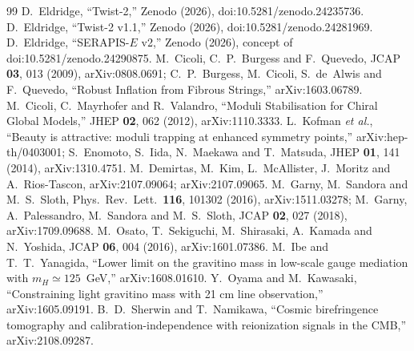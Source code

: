 \documentclass[aps,prd,twocolumn,superscriptaddress,nofootinbib,showkeys]{revtex4-2}
\begin{document}
\begin{thebibliography}{99}
 D.~Eldridge, ``Twist-2,'' Zenodo (2026), doi:10.5281/zenodo.24235736.
 D.~Eldridge, ``Twist-2 v1.1,'' Zenodo (2026), doi:10.5281/zenodo.24281969.
 D.~Eldridge, ``SERAPIS-$E$ v2,'' Zenodo (2026), concept of doi:10.5281/zenodo.24290875.
 M.~Cicoli, C.~P.~Burgess and F.~Quevedo, JCAP \textbf{03}, 013 (2009), arXiv:0808.0691; C.~P.~Burgess, M.~Cicoli, S.~de~Alwis and F.~Quevedo, ``Robust Inflation from Fibrous Strings,'' arXiv:1603.06789.
 M.~Cicoli, C.~Mayrhofer and R.~Valandro, ``Moduli Stabilisation for Chiral Global Models,'' JHEP \textbf{02}, 062 (2012), arXiv:1110.3333.
 L.~Kofman \emph{et al.}, ``Beauty is attractive: moduli trapping at enhanced symmetry points,'' arXiv:hep-th/0403001; S.~Enomoto, S.~Iida, N.~Maekawa and T.~Matsuda, JHEP \textbf{01}, 141 (2014), arXiv:1310.4751.
 M.~Demirtas, M.~Kim, L.~McAllister, J.~Moritz and A.~Rios-Tascon, arXiv:2107.09064; arXiv:2107.09065.
 M.~Garny, M.~Sandora and M.~S.~Sloth, Phys.\ Rev.\ Lett.\ \textbf{116}, 101302 (2016), arXiv:1511.03278; M.~Garny, A.~Palessandro, M.~Sandora and M.~S.~Sloth, JCAP \textbf{02}, 027 (2018), arXiv:1709.09688.
 M.~Osato, T.~Sekiguchi, M.~Shirasaki, A.~Kamada and N.~Yoshida, JCAP \textbf{06}, 004 (2016), arXiv:1601.07386.
 M.~Ibe and T.~T.~Yanagida, ``Lower limit on the gravitino mass in low-scale gauge mediation with $m_H\simeq125$~GeV,'' arXiv:1608.01610.
 Y.~Oyama and M.~Kawasaki, ``Constraining light gravitino mass with 21 cm line observation,'' arXiv:1605.09191.
 B.~D.~Sherwin and T.~Namikawa, ``Cosmic birefringence tomography and calibration-independence with reionization signals in the CMB,'' arXiv:2108.09287.
\end{thebibliography}
\end{document}
